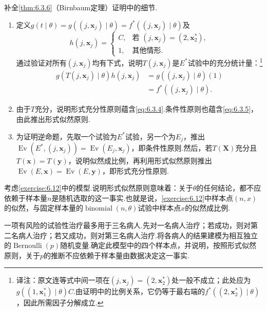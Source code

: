 \begin{exercise}\label{exercise:6.33}
补全\autoref{thm:6.3.6}（Birnbaum定理）证明中的细节.
\begin{enumerate}[label=(\alph*)]
\item 定义$g(t\mid\theta)=g((j,\boldsymbol x_j)\mid\theta)=f^*((j,\boldsymbol x_j)\mid\theta)$及
$$h(j,\boldsymbol x_j)=\begin{cases}C,&\text{若 }(j,\boldsymbol x_j)=(2,\boldsymbol x_2^*),\\1,&\text{其他情形}.\end{cases}$$
通过验证对所有$(j,\boldsymbol x_j)$均有下式，说明$T(j,\boldsymbol x_j)$是$E^*$试验中的充分统计量：\footnote{译注：原文连等式中间一项在$(j,\boldsymbol x_j)=(2,\boldsymbol x_2^*)$处一般不成立；此处应为$g((1,\boldsymbol x_1^*)\mid\theta)C$.由证明中的比例关系，它仍等于最右端的$f^*((2,\boldsymbol x_2^*)\mid\theta)$，因此所需因子分解成立.}
\begin{align*}
g(T(j,\boldsymbol x_j)\mid\theta)h(j,\boldsymbol x_j)
&=g((j,\boldsymbol x_j)\mid\theta)(1)\\
&=f^*((j,\boldsymbol x_j)\mid\theta).
\end{align*}
\item 由于$T$充分，说明形式充分性原则蕴含\eqref{eq:6.3.4}.条件性原则也蕴含\eqref{eq:6.3.5}，由此推出形式似然原则.
\item 为证明逆命题，先取一个试验为$E^*$试验，另一个为$E_j$，推出$\operatorname{Ev}(E^*,(j,\boldsymbol x_j))=\operatorname{Ev}(E_j,\boldsymbol x_j)$，即条件性原则.然后，若$T(\boldsymbol X)$充分且$T(\boldsymbol x)=T(\boldsymbol y)$，说明似然成比例，再利用形式似然原则推出$\operatorname{Ev}(E,\boldsymbol x)=\operatorname{Ev}(E,\boldsymbol y)$，即形式充分性原则.
\end{enumerate}
\end{exercise}
\begin{exercise}\label{exercise:6.34}
考虑\autoref{exercise:6.12}中的模型.说明形式似然原则意味着：关于$\theta$的任何结论，都不应依赖于样本量$n$是随机选取的这一事实.也就是说，\autoref{exercise:6.12}中样本点$(n,x)$的似然，与固定样本量的$\operatorname{binomial}(n,\theta)$试验中样本点$x$的似然成比例.
\end{exercise}
\begin{exercise}\label{exercise:6.35}
一项有风险的试验性治疗最多用于三名病人.先对一名病人治疗；若成功，则对第二名病人治疗；若又成功，则对第三名病人治疗.将各病人的结果建模为相互独立的$\operatorname{Bernoulli}(p)$随机变量.确定此模型中的四个样本点，并说明，按照形式似然原则，关于$p$的推断不应依赖于样本量由数据决定这一事实.
\end{exercise}

